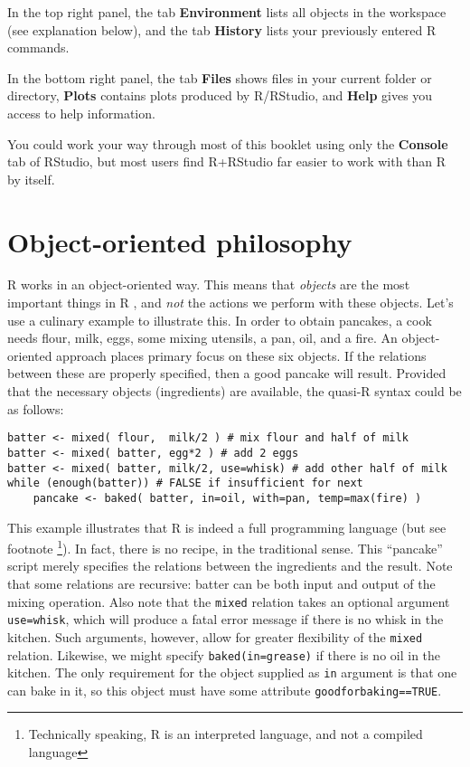 \documentclass[
]{book}
\begin{document}
In the top right panel, the tab \textbf{Environment} lists all objects in the workspace (see explanation below), and the tab \textbf{History} lists your previously entered R commands.

In the bottom right panel, the tab \textbf{Files} shows files in your current folder or directory, \textbf{Plots} contains plots produced by R/RStudio, and \textbf{Help} gives you access to help information.

You could work your way through most of this booklet using only the \textbf{Console} tab of RStudio, but most users find R+RStudio far easier to work with than R by itself.

\hypertarget{sec:objectorientedphilosophy}{%
\section{Object-oriented philosophy}\label{sec:objectorientedphilosophy}}

R works in an object-oriented way. This means that
\emph{objects} are the most important things in R , and \emph{not}
the actions we perform with these objects. Let's use a culinary example
to illustrate this. In order to obtain pancakes, a cook needs flour,
milk, eggs, some mixing utensils, a pan, oil, and a fire. An
object-oriented approach places primary focus on these six objects. If
the relations between these are properly specified, then a good pancake
will result. Provided that the necessary objects (ingredients) are
available, the quasi-R syntax could be as follows:

\begin{verbatim}
batter <- mixed( flour,  milk/2 ) # mix flour and half of milk
batter <- mixed( batter, egg*2 ) # add 2 eggs
batter <- mixed( batter, milk/2, use=whisk) # add other half of milk
while (enough(batter)) # FALSE if insufficient for next
    pancake <- baked( batter, in=oil, with=pan, temp=max(fire) )
\end{verbatim}

This example illustrates that R is indeed a full
programming language (but see footnote \footnote{Technically speaking, R is an interpreted language, and not a compiled language}).
In fact, there is no recipe, in the
traditional sense. This ``pancake'' script merely specifies the relations
between the ingredients and the result. Note that some relations are
recursive: batter can be both input and output of the mixing operation.
Also note that the \texttt{mixed} relation takes an
optional argument \texttt{use=whisk}, which will produce
a fatal error message if there is no whisk in the kitchen. Such
arguments, however, allow for greater flexibility of the
\texttt{mixed} relation. Likewise, we might specify
\texttt{baked(in=grease)} if there is no oil in the
kitchen. The only requirement for the object supplied as
\texttt{in} argument is that one can bake in it, so this
object must have some attribute
\texttt{goodforbaking==TRUE}.
\end{document}
